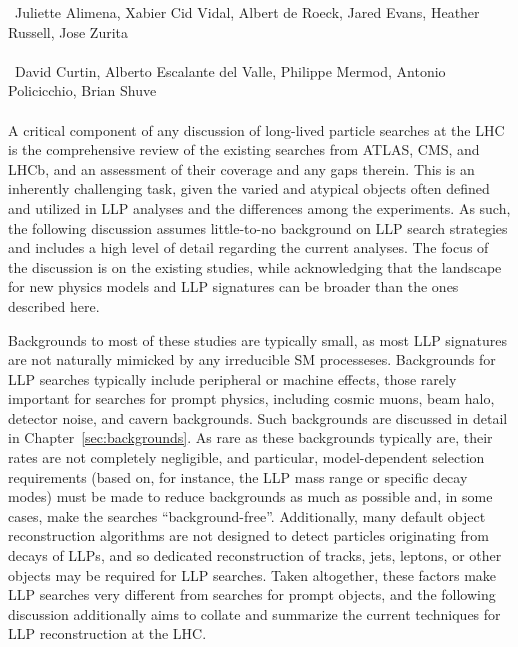 ~Juliette Alimena, Xabier Cid Vidal, Albert de Roeck, Jared Evans, Heather Russell, Jose Zurita\\
\text{ \; }\\
~David Curtin, Alberto Escalante del Valle, Philippe Mermod, Antonio Policicchio, Brian Shuve\\
\text{ \; }\\

\noindent A critical component of any discussion of long-lived particle searches at the LHC is the comprehensive review of the existing searches from ATLAS, CMS, and LHCb, and an assessment of their coverage and any gaps therein. This is an inherently challenging task, given the varied and atypical objects often defined and utilized in LLP analyses and the differences among the experiments. As such, the following discussion assumes little-to-no background on LLP search strategies and includes a high level of detail regarding the current analyses. The focus of the discussion is on the existing studies, while acknowledging that the landscape for new physics models and LLP signatures can be broader than the ones described here.

Backgrounds to most of these studies are typically small, as most LLP signatures are not naturally mimicked by any irreducible SM processeses. Backgrounds for LLP searches typically include peripheral or machine effects, those rarely important for searches for prompt physics, including cosmic muons, beam halo, detector noise, and cavern backgrounds. Such backgrounds are discussed in detail in Chapter~\ref{sec:backgrounds}. As rare as these backgrounds typically are, their rates are not completely negligible, and particular, model-dependent selection requirements (based on, for instance, the LLP mass range or specific decay modes) must be made to reduce backgrounds as much as possible and, in some cases, make the searches ``background-free''. Additionally, many default object reconstruction algorithms are not designed to detect particles originating from decays of LLPs, and so dedicated reconstruction of tracks, jets, leptons, or other objects may be required for LLP searches. Taken altogether, these factors make LLP searches very different from searches for prompt objects, and the following discussion additionally aims to collate and summarize the current techniques for LLP reconstruction at the LHC.

